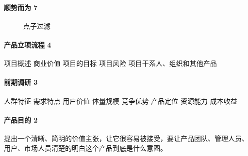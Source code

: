 \documentclass[letterpaper,11pt,english]{sphinxmanual}
\begin{document}
\paragraph{顺势而为 7\sphinxfootnotemark[143]}
\label{\detokenize{chapter_skill/BRD:id2}}%
\begin{footnotetext}[143]\sphinxAtStartFootnote
{}
%
\end{footnotetext}\ignorespaces 
\begin{figure}[H]
\centering
\capstart

\noindent{}
\caption{点子过滤}\label{\detokenize{chapter_skill/BRD:id16}}\end{figure}


\paragraph{产品立项流程 4\sphinxfootnotemark[144]}
\label{\detokenize{chapter_skill/BRD:id3}}%
\begin{footnotetext}[144]\sphinxAtStartFootnote
{}
%
\end{footnotetext}\ignorespaces 
项目概述 商业价值 项目的目标 项目风险 项目干系人、组织和其他产品


\paragraph{前期调研 3\sphinxfootnotemark[145]}
\label{\detokenize{chapter_skill/BRD:id4}}%
\begin{footnotetext}[145]\sphinxAtStartFootnote
{}
%
\end{footnotetext}\ignorespaces 
人群特征 需求特点 用户价值 体量规模 竞争优势 产品定位 资源能力 成本收益


\paragraph{产品目的 2\sphinxfootnotemark[146]}
\label{\detokenize{chapter_skill/BRD:id5}}%
\begin{footnotetext}[146]\sphinxAtStartFootnote
{}
%
\end{footnotetext}\ignorespaces 
提出一个清晰、简明的价值主张，让它很容易被接受，要让产品团队、管理人员、用户、市场人员清楚的明白这个产品到底是什么意图。
\end{document}
